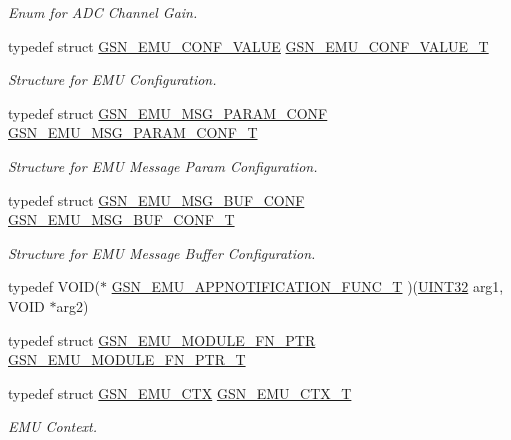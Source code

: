 \begin{DoxyCompactItemize}
\begin{DoxyCompactList}\small\item\em Enum for ADC Channel Gain. \end{DoxyCompactList}\item 
typedef struct \hyperlink{a00058}{GSN\_\-EMU\_\-CONF\_\-VALUE} \hyperlink{a00663_ga4d86ed7ecbdc155ecc41c47de7739775}{GSN\_\-EMU\_\-CONF\_\-VALUE\_\-T}
\begin{DoxyCompactList}\small\item\em Structure for EMU Configuration. \end{DoxyCompactList}\item 
typedef struct \hyperlink{a00064}{GSN\_\-EMU\_\-MSG\_\-PARAM\_\-CONF} \hyperlink{a00663_gae3dd9cf1f519ba6879f6f928ac33c1c4}{GSN\_\-EMU\_\-MSG\_\-PARAM\_\-CONF\_\-T}
\begin{DoxyCompactList}\small\item\em Structure for EMU Message Param Configuration. \end{DoxyCompactList}\item 
typedef struct \hyperlink{a00063}{GSN\_\-EMU\_\-MSG\_\-BUF\_\-CONF} \hyperlink{a00663_gacf296ce2d4fd56e05d1ddfc4e41e07ce}{GSN\_\-EMU\_\-MSG\_\-BUF\_\-CONF\_\-T}
\begin{DoxyCompactList}\small\item\em Structure for EMU Message Buffer Configuration. \end{DoxyCompactList}\item 
typedef VOID($\ast$ \hyperlink{a00489_ab0fa7e48e947d0a8dd37314d7aee6ba7}{GSN\_\-EMU\_\-APPNOTIFICATION\_\-FUNC\_\-T} )(\hyperlink{a00660_gae1e6edbbc26d6fbc71a90190d0266018}{UINT32} arg1, VOID $\ast$arg2)
\item 
typedef struct \hyperlink{a00061}{GSN\_\-EMU\_\-MODULE\_\-FN\_\-PTR} \hyperlink{a00489_a93b7b6a5c3db3b4f85b0825b96f47ab4}{GSN\_\-EMU\_\-MODULE\_\-FN\_\-PTR\_\-T}
\item 
typedef struct \hyperlink{a00059}{GSN\_\-EMU\_\-CTX} \hyperlink{a00663_gaf9de9f7ae5f3e644a9f1ad8df793ec4f}{GSN\_\-EMU\_\-CTX\_\-T}
\begin{DoxyCompactList}\small\item\em EMU Context. \end{DoxyCompactList}\end{DoxyCompactItemize}
